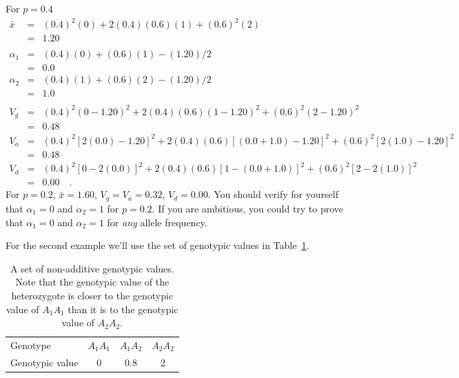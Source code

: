 \documentclass[12pt]{article}
\begin{document}
For $p = 0.4$
\begin{eqnarray*}
{\bar x} &=& (0.4)^2(0) + 2(0.4)(0.6)(1) + (0.6)^2(2) \\
                    &=& 1.20 \\
\\
\alpha_1 &=& (0.4)(0) + (0.6)(1) - (1.20)/2 \\
         &=& 0.0 \\
\alpha_2 &=& (0.4)(1) + (0.6)(2) - (1.20)/2 \\
         &=& 1.0 \\
\\
V_g &=& (0.4)^2(0-1.20)^2 + 2(0.4)(0.6)(1-1.20)^2 + (0.6)^2(2-1.20)^2 \\
    &=& 0.48 \\
V_a &=& (0.4)^2[2(0.0)-1.20]^2 + 2(0.4)(0.6)[(0.0+1.0)-1.20]^2
       + (0.6)^2[2(1.0)-1.20]^2 \\
    &=& 0.48 \\
V_d &=& (0.4)^2[0 - 2(0.0)]^2 + 2(0.4)(0.6)[1 - (0.0+1.0)]^2
       + (0.6)^2[2 - 2(1.0)]^2 \\
    &=& 0.00 \quad . 
\end{eqnarray*}
For $p = 0.2$, ${\bar x} = 1.60$, $V_g = V_a = 0.32$, $V_d = 0.00$. 
You should verify for yourself that $\alpha_1=0$ and $\alpha_2=1$ for
$p=0.2$.  If you are ambitious, you could try to prove that
$\alpha_1=0$ and $\alpha_2=1$ for {\it any\/} allele frequency.

For the second example we'll use the set of genotypic values in
Table~\ref{table:non-additive}.

\begin{table}
\begin{center}
\begin{tabular}{l|ccc}
\hline\hline
Genotype        & $A_1A_1$ & $A_1A_2$ & $A_2A_2$ \\
Genotypic value & 0        & 0.8      & 2 \\
\hline
\end{tabular}
\end{center}
\caption{A set of non-additive genotypic values. Note that the
  genotypic value of the heterozygote is closer to the genotypic value
  of $A_1A_1$ than it is to the genotypic value of $A_2A_2$.}\label{table:non-additive}
\end{table}
\end{document}
